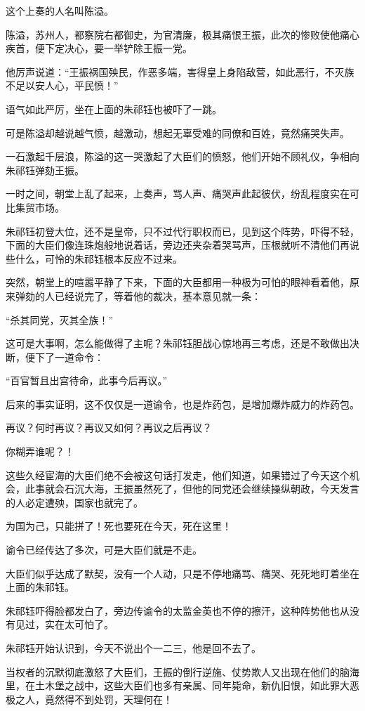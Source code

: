\begin{multicols}{\theparacolNo}
这个上奏的人名叫陈溢。

陈溢，苏州人，都察院右都御史，为官清廉，极其痛恨王振，此次的惨败使他痛心疾首，便下定决心，要一举铲除王振一党。

他厉声说道：“王振祸国殃民，作恶多端，害得皇上身陷敌营，如此恶行，不灭族不足以安人心，平民愤！”

语气如此严厉，坐在上面的朱祁钰也被吓了一跳。

可是陈溢却越说越气愤，越激动，想起无辜受难的同僚和百姓，竟然痛哭失声。

一石激起千层浪，陈溢的这一哭激起了大臣们的愤怒，他们开始不顾礼仪，争相向朱祁钰弹劾王振。

一时之间，朝堂上乱了起来，上奏声，骂人声、痛哭声此起彼伏，纷乱程度实在可比集贸市场。

朱祁钰初登大位，还不是皇帝，只不过代行职权而已，见到这个阵势，吓得不轻，下面的大臣们像连珠炮般地说着话，旁边还夹杂着哭骂声，压根就听不清他们再说些什么，可怜的朱祁钰根本反应不过来。

突然，朝堂上的喧嚣平静了下来，下面的大臣都用一种极为可怕的眼神看着他，原来弹劾的人已经说完了，等着他的裁决，基本意见就一条：

“杀其同党，灭其全族！”

这可是大事啊，怎么能做得了主呢？朱祁钰胆战心惊地再三考虑，还是不敢做出决断，便下了一道命令：

“百官暂且出宫待命，此事今后再议。”

后来的事实证明，这不仅仅是一道谕令，也是炸药包，是增加爆炸威力的炸药包。

再议？何时再议？再议又如何？再议之后再议？

你糊弄谁呢？！

这些久经宦海的大臣们绝不会被这句话打发走，他们知道，如果错过了今天这个机会，此事就会石沉大海，王振虽然死了，但他的同党还会继续操纵朝政，今天发言的人必定遭殃，国家也就完了。

为国为己，只能拼了！死也要死在今天，死在这里！

谕令已经传达了多次，可是大臣们就是不走。

大臣们似乎达成了默契，没有一个人动，只是不停地痛骂、痛哭、死死地盯着坐在上面的朱祁钰。

朱祁钰吓得脸都发白了，旁边传谕令的太监金英也不停的擦汗，这种阵势他也从没有见过，实在太可怕了。

朱祁钰开始认识到，今天不说出个一二三，他是回不去了。

当权者的沉默彻底激怒了大臣们，王振的倒行逆施、仗势欺人又出现在他们的脑海里，在土木堡之战中，这些大臣们也多有亲属、同年毙命，新仇旧恨，如此罪大恶极之人，竟然得不到处罚，天理何在！


\end{multicols}
